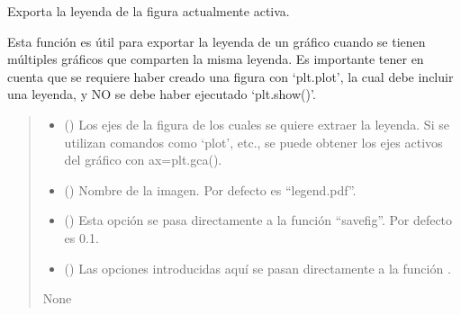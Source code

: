 \documentclass[letterpaper,10pt,english]{sphinxmanual}
\begin{document}
\begin{fulllineitems}
\label{\detokenize{utils:utils.export_legend_plt}}
\pysigstartsignatures
{}
\pysigstopsignatures
\sphinxAtStartPar
Exporta la leyenda de la figura actualmente activa.

\sphinxAtStartPar
Esta función es útil para exportar la leyenda de un gráfico cuando se tienen
múltiples gráficos que comparten la misma leyenda. Es importante tener en cuenta
que se requiere haber creado una figura con ‘plt.plot’, la cual debe incluir una
leyenda, y NO se debe haber ejecutado ‘plt.show()’.
\begin{quote}\begin{description}
\begin{itemize}
\item {} 
\sphinxAtStartPar
{} () \textendash{} Los ejes de la figura de los cuales se quiere extraer la leyenda. Si se utilizan
comandos como ‘plot’, etc., se puede obtener los ejes activos del gráfico con
ax=plt.gca().

\item {} 
\sphinxAtStartPar
{} (\sphinxstyleliteralemphasis{\sphinxupquote{, }}) \textendash{} Nombre de la imagen. Por defecto es “legend.pdf”.

\item {} 
\sphinxAtStartPar
{} (\sphinxstyleliteralemphasis{\sphinxupquote{, }}) \textendash{} Esta opción se pasa directamente a la función “savefig”. Por defecto es 0.1.

\item {} 
\sphinxAtStartPar
{} () \textendash{} Las opciones introducidas aquí se pasan directamente a la función .

\end{itemize}

\sphinxAtStartPar
None

\end{description}\end{quote}

\end{fulllineitems}
\end{document}

